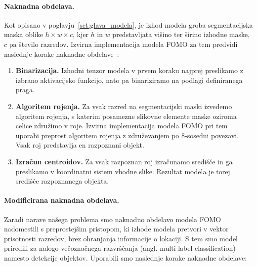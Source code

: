 \documentclass[a4paper,twoside,openright,12pt,slovene]{book}
\begin{document}
            \paragraph{Naknadna obdelava.} \label{sct:fomo_orig_postprocessing}
            Kot opisano v poglavju~\ref{sct:glava_modela}, je izhod modela groba segmentacijska maska oblike $h \times w \times c$, kjer $h$ in $w$ predstavljata višino ter širino izhodne maske, $c$ pa število razredov. 
            Izvirna implementacija modela FOMO za tem predvidi naslednje korake naknadne obdelave~\cite{src:fomodocs}:
            \begin{enumerate}
                \item \textbf{Binarizacija.} Izhodni tenzor modela v prvem koraku najprej preslikamo z izbrano aktivacijsko funkcijo, nato pa binariziramo na podlagi definiranega praga.
                \item \textbf{Algoritem rojenja.} Za vsak razred na segmentacijski maski izvedemo algoritem rojenja, s katerim posamezne slikovne elemente maske oziroma celice združimo v roje. Izvirna implementacija modela FOMO pri tem uporabi preprost algoritem rojenja z združevanjem po 8-sosedni povezavi. Vsak roj predstavlja en razpoznani objekt.
                \item \textbf{Izračun centroidov.} Za vsak razpoznan roj izračunamo središče in ga preslikamo v koordinatni sistem vhodne slike. Rezultat modela je torej središče razpoznanega objekta.%
            \end{enumerate}

            \paragraph{Modificirana naknadna obdelava.} \label{sct:fomo_custom_postprocessing}
            Zaradi narave našega problema smo naknadno obdelavo modela FOMO nadomestili s preprostejšim pristopom, ki izhode modela pretvori v vektor prisotnosti razredov, brez ohranjanja informacije o lokaciji.
            S tem smo model priredili za nalogo večoznačnega razvrščanja (angl. multi-label classification) namesto detekcije objektov. Uporabili smo naslednje korake naknadne obdelave:
            
\end{document}
